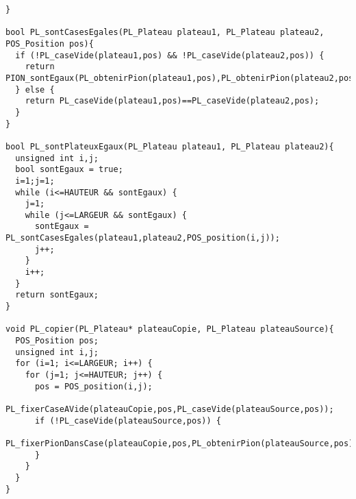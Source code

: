 \begin{lstlisting}
}

bool PL_sontCasesEgales(PL_Plateau plateau1, PL_Plateau plateau2, POS_Position pos){
  if (!PL_caseVide(plateau1,pos) && !PL_caseVide(plateau2,pos)) {
    return PION_sontEgaux(PL_obtenirPion(plateau1,pos),PL_obtenirPion(plateau2,pos));
  } else {
    return PL_caseVide(plateau1,pos)==PL_caseVide(plateau2,pos);
  }
}

bool PL_sontPlateuxEgaux(PL_Plateau plateau1, PL_Plateau plateau2){
  unsigned int i,j;
  bool sontEgaux = true;
  i=1;j=1;
  while (i<=HAUTEUR && sontEgaux) {
    j=1;
    while (j<=LARGEUR && sontEgaux) {
      sontEgaux = PL_sontCasesEgales(plateau1,plateau2,POS_position(i,j));
      j++;
    }
    i++;
  }
  return sontEgaux;
}

void PL_copier(PL_Plateau* plateauCopie, PL_Plateau plateauSource){
  POS_Position pos;
  unsigned int i,j;
  for (i=1; i<=LARGEUR; i++) {
    for (j=1; j<=HAUTEUR; j++) {
      pos = POS_position(i,j);
      PL_fixerCaseAVide(plateauCopie,pos,PL_caseVide(plateauSource,pos));
      if (!PL_caseVide(plateauSource,pos)) {
        PL_fixerPionDansCase(plateauCopie,pos,PL_obtenirPion(plateauSource,pos));
      }
    }
  }
}
\end{lstlisting}

